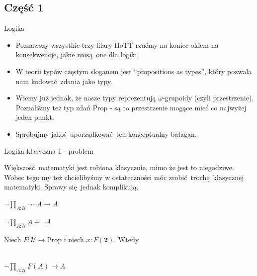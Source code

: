 \documentclass{beamer}
\newcommand{\U}{\mathcal{U}}
\newcommand{\Prop}{\text{Prop}}
\begin{document}
\subsection{Część 1}

\begin{frame}{Logika}
\begin{itemize}
	\item Poznawszy wszystkie trzy filary HoTT rzućmy na koniec okiem na konsekwencje, jakie niosą one dla logiki.
	\item W teorii typów częstym sloganem jest ``propositions as types'', który pozwala nam kodować zdania jako typy.
	\item Wiemy już jednak, że nasze typy reprezentują $\omega$-grupoidy (czyli przestrzenie). Poznaliśmy też typ zdań $\Prop$ - są to przestrzenie mogące mieć co najwyżej jeden punkt.
	\item Spróbujmy jakoś uporządkować ten konceptualny bałagan.
\end{itemize}
\end{frame}

\begin{frame}{Logika klasyczna 1 - problem}

Większość matematyki jest robiona klasycznie, mimo że jest to niegodziwe. Wobec tego my też chcielibyśmy w ostateczności móc zrobić trochę klasycznej matematyki. Sprawy się jednak komplikują.

\begin{theorem}[Lemat 3.2.2]
$\neg \prod_{A : \U} \neg\neg A \to A$
\end{theorem}

\begin{corollary}[Corollary 3.2.7]
$\neg \prod_{A : \U} A + \neg A$
\end{corollary}

\begin{theorem}
Niech $F : \U \to \Prop$ i niech $x : F(\mathbf{2})$. Wtedy \\~\

$\neg \prod_{A : \U} F(A) \to A$
\end{theorem}

\end{frame}
\end{document}
